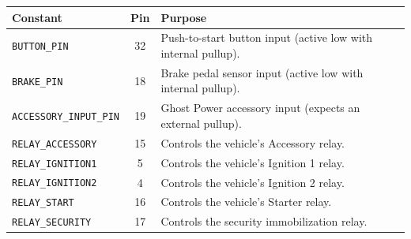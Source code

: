 \documentclass{article}
\begin{document}
\begin{center}
\begin{tabular}{|l|c|p{}|}
\hline
\textbf{Constant} & \textbf{Pin} & \textbf{Purpose} \\
\hline
\texttt{BUTTON\_PIN} & 32 & Push-to-start button input (active low with internal pullup). \\
\hline
\texttt{BRAKE\_PIN} & 18 & Brake pedal sensor input (active low with internal pullup). \\
\hline
\texttt{ACCESSORY\_INPUT\_PIN} & 19 & Ghost Power accessory input (expects an external pullup). \\
\hline
\texttt{RELAY\_ACCESSORY} & 15 & Controls the vehicle's Accessory relay. \\
\hline
\texttt{RELAY\_IGNITION1} & 5 & Controls the vehicle's Ignition 1 relay. \\
\hline
\texttt{RELAY\_IGNITION2} & 4 & Controls the vehicle's Ignition 2 relay. \\
\hline
\texttt{RELAY\_START} & 16 & Controls the vehicle's Starter relay. \\
\hline
\texttt{RELAY\_SECURITY} & 17 & Controls the security immobilization relay. \\
\hline
\end{tabular}
\end{center}
\end{document}
